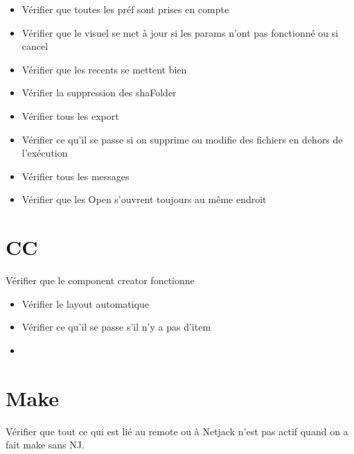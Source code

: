 \documentclass[a4paper]{article}
\begin{document}
\begin{itemize}
\item Vérifier que toutes les préf sont prises en compte 
\item Vérifier que le visuel se met à jour si les params n'ont pas fonctionné ou si cancel
\item Vérifier que les recents se mettent bien
\item Vérifier la suppression des shaFolder
\item Vérifier tous les export
\end{itemize}

\begin{itemize}
\item Vérifier ce qu'il se passe si on supprime ou modifie des fichiers en dehors de l'exécution
\item Vérifier tous les messages
\item Vérifier que les Open s'ouvrent toujours au même endroit
\end{itemize}

\section{CC}

Vérifier que le component creator fonctionne
\begin{itemize}
\item Vérifier le layout automatique
\item Vérifier ce qu'il se passe s'il n'y a pas d'item
\item 
\end{itemize}

\section{Make}

Vérifier que tout ce qui est  lié au remote ou à Netjack n'est pas actif quand on a fait make sans NJ.
\end{document}
